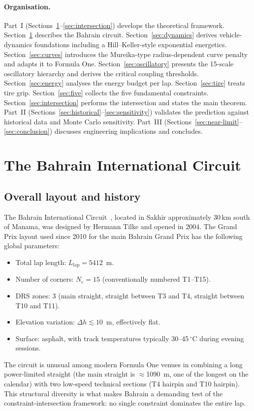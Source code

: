 \documentclass[11pt,twocolumn]{article}
\theoremstyle{definition}
\theoremstyle{remark}
\begin{document}
\paragraph{Organisation.}
Part~I (Sections~\ref{sec:circuit}--\ref{sec:intersection}) develops the
theoretical framework. Section~\ref{sec:circuit} describes the Bahrain
circuit. Section~\ref{sec:dynamics} derives vehicle-dynamics foundations
including a Hill--Keller-style exponential energetics. Section~\ref{sec:curves}
introduces the Mureika-type radius-dependent curve penalty and adapts it to
Formula One. Section~\ref{sec:oscillatory} presents the 15-scale oscillatory
hierarchy and derives the critical coupling thresholds. Section~\ref{sec:energy}
analyses the energy budget per lap. Section~\ref{sec:tire} treats tire grip.
Section~\ref{sec:five} collects the five fundamental constraints.
Section~\ref{sec:intersection} performs the intersection and states the main
theorem.
Part~II (Sections~\ref{sec:historical}--\ref{sec:sensitivity}) validates the
prediction against historical data and Monte Carlo sensitivity.
Part~III (Sections~\ref{sec:near-limit}--\ref{sec:conclusion}) discusses
engineering implications and concludes.

\section{The Bahrain International Circuit}
\label{sec:circuit}

\subsection{Overall layout and history}

The Bahrain International Circuit~\cite{formula1web,lotus1965}, located in
Sakhir approximately 30\,km south of Manama, was designed by Hermann Tilke
and opened in 2004. The Grand Prix
layout used since 2010 for the main Bahrain Grand Prix has the following
global parameters:
\begin{itemize}[leftmargin=1.5em]
  \item Total lap length: $L_{\mathrm{lap}} = 5412$~m.
  \item Number of corners: $N_c = 15$ (conventionally numbered T1--T15).
  \item DRS zones: 3 (main straight, straight between T3 and T4, straight
        between T10 and T11).
  \item Elevation variation: $\Delta h \lesssim 10$~m, effectively flat.
  \item Surface: asphalt, with track temperatures typically 30--45\,$^\circ$C
        during evening sessions.
\end{itemize}
The circuit is unusual among modern Formula One venues in combining a long
power-limited straight (the main straight is $\approx$1090~m, one of the
longest on the calendar) with two low-speed technical sections (T4 hairpin and
T10 hairpin). This structural diversity is what makes Bahrain a demanding test
of the constraint-intersection framework: no single constraint dominates the
entire lap.
\end{document}
